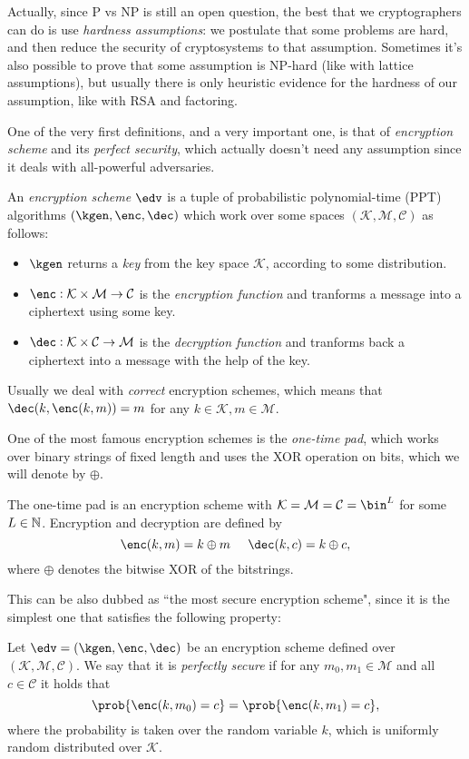 Actually, since P vs NP is still an open question, the best that we cryptographers can do is use \emph{hardness assumptions}: we postulate that some problems are hard, and then reduce the security of cryptosystems to that assumption. Sometimes it's also possible to prove that some assumption is NP-hard (like with lattice assumptions), but usually there is only heuristic evidence for the hardness of our assumption, like with RSA and factoring.

One of the very first definitions, and a very important one, is that of \emph{encryption scheme} and its \emph{perfect security}, which actually doesn't need any assumption since it deals with all-powerful adversaries.

\begin{definition}
    An \emph{encryption scheme} $\edv$ is a tuple of probabilistic polynomial-time (PPT) algorithms $(\kgen,\enc,\dec)$ which work over some spaces $(\mathcal K, \mathcal M, \mathcal C)$ as follows:
    \begin{itemize}
        \item $\kgen$ returns a \emph{key} from the key space $\mathcal K$, according to some distribution.
        \item $\enc:\mathcal K\times\mathcal M\to \mathcal C$ is the \emph{encryption function} and tranforms a message into a ciphertext using some key.
        \item $\dec: \mathcal K\times\mathcal C\to \mathcal M$ is the \emph{decryption function} and tranforms back a ciphertext into a message with the help of the key.
    \end{itemize}
    Usually we deal with \emph{correct} encryption schemes, which means that $\dec(k,\enc(k,m))=m$ for any $k\in\mathcal K,m\in\mathcal M$.
\end{definition}

One of the most famous encryption schemes is the \emph{one-time pad}, which works over binary strings of fixed length and uses the XOR operation on bits, which we will denote by $\oplus$.

\begin{definition}
    The one-time pad is an encryption scheme with $\mathcal K=\mathcal M=\mathcal C=\bin^L$ for some $L\in\mathbb{N}$. Encryption and decryption are defined by
    $$ \enc(k,m)=k\oplus m\;\;\;\;\; \dec(k,c)=k\oplus c,$$
    where $\oplus$ denotes the bitwise XOR of the bitstrings.
\end{definition}

This can be also dubbed as ``the most secure encryption scheme", since it is the simplest one that satisfies the following property:
\begin{definition}
    Let $\edv=(\kgen,\enc,\dec)$ be an encryption scheme defined over $(\mathcal K, \mathcal M, \mathcal C)$. We say that it is \emph{perfectly secure} if for any $m_0,m_1\in\mathcal M$ and all $c\in\mathcal C$ it holds that 
    $$\prob{\enc(k,m_0)=c} = \prob{\enc(k,m_1)=c},$$
    where the probability is taken over the random variable $k$, which is uniformly random distributed over $\mathcal K$.
\end{definition}

